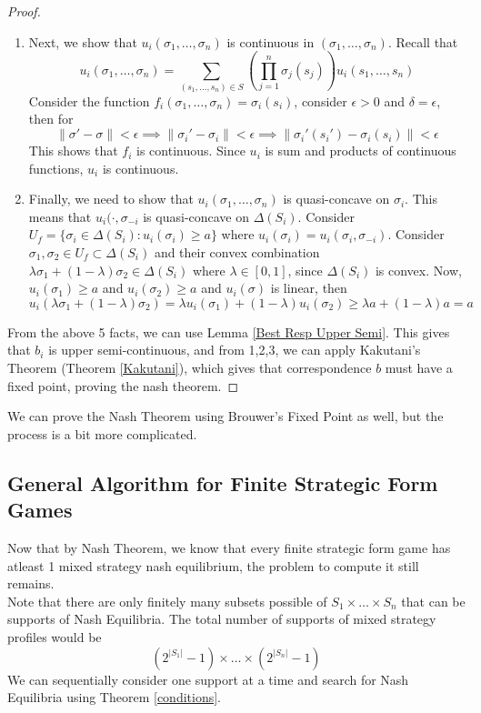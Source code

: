 \documentclass{article}
\theoremstyle{definition}
\begin{document}
\begin{proof}
\begin{enumerate}
	\item Next, we show that $u_i(\sigma_1,\dots,\sigma_n)$ is continuous in $(\sigma_1,\dots,\sigma_n)$. Recall that $$u_i(\sigma_1,\dots,\sigma_n) = \sum_{(s_1,\dots,s_n)\in S} \left(\prod_{j=1}^n \sigma_j(s_j)\right) u_i(s_1,\dots,s_n)$$ Consider the function $f_i(\sigma_1,\dots,\sigma_n) = \sigma_i(s_i)$, consider $\epsilon >0$ and $\delta = \epsilon$, then for $$\| \sigma' - \sigma\|<\epsilon \implies \|\sigma_i' -\sigma_i\|<\epsilon \implies \|\sigma_i'(s_i') -\sigma_i(s_i)\|<\epsilon$$ This shows that $f_i$ is continuous. Since $u_i$ is sum and products of continuous functions, $u_i$ is continuous.
	\item Finally, we need to show that $u_i(\sigma_1,\dots,\sigma_n)$ is quasi-concave on $\sigma_i$. This means that $u_i(\cdot,\sigma_{-i}$ is quasi-concave on $\Delta(S_i)$. Consider $U_f = \{\sigma_i \in \Delta(S_i): u_i(\sigma_i)\geq a\}$ where $u_i(\sigma_i) = u_i(\sigma_i,\sigma_{-i})$. Consider $\sigma_1,\sigma_2 \in U_f\subset \Delta(S_i)$ and their convex combination $\lambda\sigma_1 + (1-\lambda)\sigma_2 \in \Delta(S_i)$ where $\lambda\in[0,1]$, since $\Delta(S_i)$ is convex. Now, $u_i(\sigma_1)\geq a$ and $u_i(\sigma_2)\geq a$ and $u_i(\sigma)$ is linear, then $$u_i(\lambda\sigma_1 + (1-\lambda)\sigma_2) = \lambda u_i(\sigma_1) + (1-\lambda)u_i(\sigma_2) \geq \lambda a + (1-\lambda)a = a$$
\end{enumerate}
From the above 5 facts, we can use Lemma \ref{Best Resp Upper Semi}. This gives that $b_i$ is upper semi-continuous, and from 1,2,3, we can apply Kakutani's Theorem (Theorem \ref{Kakutani}), which gives that correspondence $b$ must have a fixed point, proving the nash theorem. 
\end{proof}
We can prove the Nash Theorem using Brouwer's Fixed Point as well, but the process is a bit more complicated.
\subsection{General Algorithm for Finite Strategic Form Games}
Now that by Nash Theorem, we know that every finite strategic form game has atleast 1 mixed strategy nash equilibrium, the problem to compute it still remains.\\
Note that there are only finitely many subsets possible of $S_1\times\dots\times S_n$ that can be supports of Nash Equilibria. The total number of supports of mixed strategy profiles would be $$(2^{|S_1|} - 1)\times\dots\times(2^{|S_n|} - 1)$$ We can sequentially consider one support at a time and search for Nash Equilibria using Theorem \ref{conditions}.
\end{document}
